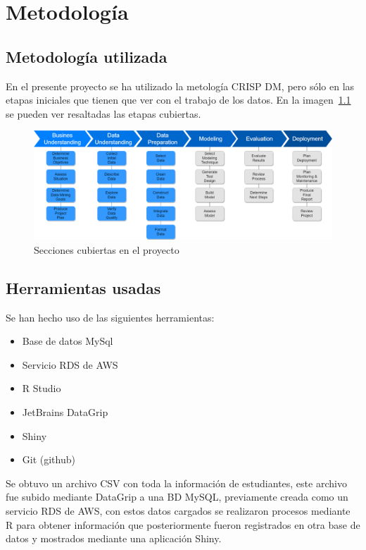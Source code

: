 \chapter{Metodología} %
\label{Chapter2} %

\section{Metodología utilizada}

En el presente proyecto se ha utilizado la metología CRISP DM\parencite{CrispBook1}, pero sólo en las etapas iniciales que tienen que ver con el trabajo de los datos. En la imagen~\ref{fig:crispdm} se pueden ver resaltadas las etapas cubiertas.

\begin{figure}[th]
\centering
\includegraphics[width=1.2\textwidth]{Figures/modelo_crisp}
\decoRule
\caption[Metodolofía Crisp DM]{Secciones cubiertas en el proyecto}
\label{fig:crispdm}
\end{figure}

\section{Herramientas usadas}

Se han hecho uso de las siguientes herramientas:

\begin{itemize}
\item Base de datos MySql
\item Servicio RDS de AWS
\item R Studio
\item JetBrains DataGrip
\item Shiny
\item Git (github)
\end{itemize}

Se obtuvo un archivo CSV con toda la información de estudiantes, este archivo fue subido mediante DataGrip a una BD MySQL, previamente creada como un servicio RDS de AWS, con estos datos cargados se realizaron procesos mediante R para obtener información que posteriormente fueron registrados en otra base de datos y mostrados mediante una aplicación Shiny.

